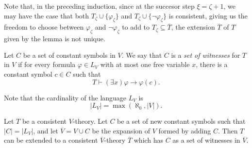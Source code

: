 \documentclass{scrartcl}
\renewcommand{\phi}{\varphi}
\begin{document}
Note that, in the preceding induction, since at the succesor step $\xi=\zeta+1$, we may have the case that both $T_\zeta \cup \{\phi_\zeta\}$ and  $T_\zeta \cup \{\neg\phi_\zeta\}$ is consistent, giving us the freedom to choose between  $\phi_\zeta$ and $\neg\phi_\zeta$ to add to $T_\zeta\subseteq \overline{T}$, the extension $\overline{T}$ of $T$ given by the lemma is not unique.


\begin{definition}
Let $C$ be a set of constant symbols in $V$. We say that $C$ is a \emph{set of witnesses} for $T$ in $V$ if for every formula $\phi\in L_V$ with at most one free variable $x$, there is a constant symbol $c\in C$ such that 
\[
T\vdash (\exists x)\phi\rightarrow \phi(c)\text{.}
\]
\end{definition}

Note that the cardinality of the language $L_V$ is 
\[
|L_V| = \max(\aleph_0,|V|).
\]

\begin{lemma}
\label{L:Add Henkin constants}
Let $T$ be a consistent $V$-theory. Let $C$ be a set of new constant symbols such that $|C| = |L_V|$, and let $\overline{V} = V\cup C$ be the expansion of $V$ formed by adding $C$. Then $T$ can be extended to a consistent $\overline{V}$-theory $\overline{T}$ which has $C$ as a set of witnesses in $\overline{V}$.
\end{lemma}
\end{document}
